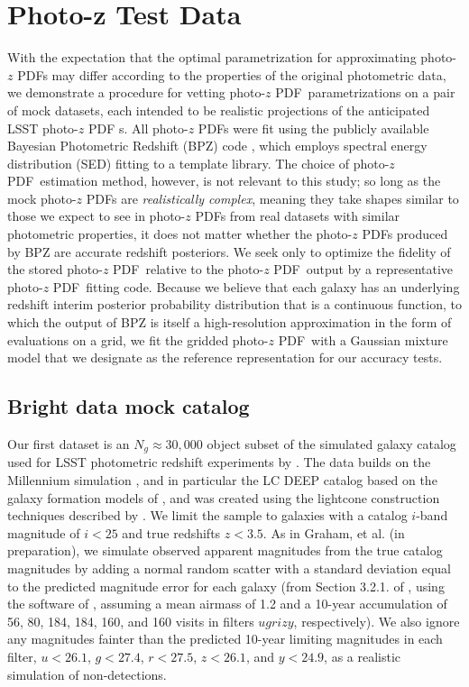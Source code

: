 \documentclass[\docopts]{\docclass}
\newcommand{\pz}{photo-$z$ PDF}
\newcommand{\Mgdata}{Bright\xspace}
\begin{document}
\section{Photo-z Test Data}
\label{sec:data}

With the expectation that the optimal parametrization for approximating \pz s 
may differ according to the properties of the original photometric data, we 
demonstrate a procedure for vetting \pz\ parametrizations on a pair of mock 
datasets, each intended to be realistic projections of the anticipated LSST \pz 
s.
All \pz s were fit using the publicly available Bayesian Photometric Redshift 
(BPZ) code \citep{benitez_bayesian_2000}, which employs spectral energy 
distribution (SED) fitting to a template library.
The choice of \pz\ estimation method, however, is not relevant to this study; 
so long as the mock \pz s are \textit{realistically complex}, meaning they take 
shapes similar to those we expect to see in \pz s from real datasets with 
similar photometric properties, it does not matter whether the \pz s produced 
by BPZ are accurate redshift posteriors.
We seek only to optimize the fidelity of the stored \pz\ relative to the \pz\ 
output by a representative \pz\ fitting code.
\citep[See][Schmidt, et al.\ in preparation for other work comparing the 
accuracy of \pz s produced by different methods.]{tanaka_photometric_2017}
Because we believe that each galaxy has an underlying redshift interim 
posterior probability distribution that is a continuous function, to which the 
output of BPZ is itself a high-resolution approximation in the form of 
evaluations on a grid, we fit the gridded \pz\ with a Gaussian mixture model 
that we designate as the reference representation for our accuracy tests.

\subsection{\Mgdata data mock catalog}
\label{sec:graham}

Our first dataset is an $N_{g}\approx30,000$ object subset of the simulated 
galaxy catalog used for LSST photometric redshift experiments by 
\citet{graham_photometric_2017}.
The data builds on the Millennium simulation \citep{springel_simulations_2005}, 
and in particular the LC DEEP catalog based on the galaxy formation models of 
\cite{gonzalez-perez_how_2014}, and was created using the lightcone 
construction techniques described by \cite{merson_lightcone_2013}.
We limit the sample to galaxies with a catalog $i$-band magnitude of $i<25$ and 
true redshifts $z<3.5$.
As in Graham, et al. (in preparation), we simulate observed apparent magnitudes 
from the true catalog magnitudes by adding a normal random scatter with a 
standard deviation equal to the predicted magnitude error for each galaxy (from 
Section 3.2.1. of \citealt{ivezic_lsst:_2008}, using the software of 
\citealt{connolly_end--end_2014}, assuming a mean airmass of 1.2 and a 10-year 
accumulation of 56, 80, 184, 184, 160, and 160 visits in filters $ugrizy$, 
respectively).
We also ignore any magnitudes fainter than the predicted 10-year limiting 
magnitudes in each filter, $u<26.1$, $g<27.4$, $r<27.5$, $z<26.1$, and 
$y<24.9$, as a realistic simulation of non-detections.
\end{document}
